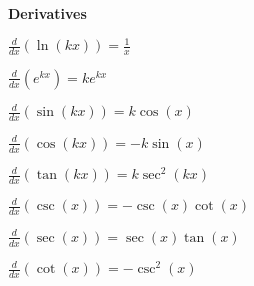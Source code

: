 \documentclass{article}
\begin{document}
\begin{multicols*}{4}
\textbf{Derivatives}

$\frac{d}{dx}(\ln(kx))=\frac{1}{x}$

$\frac{d}{dx}(e^{kx})=ke^{kx}$

$\frac{d}{dx}(\sin(kx))=k\cos(x)$

$\frac{d}{dx}(\cos(kx))=-k\sin(x)$

$\frac{d}{dx}(\tan(kx))=k\sec^2(kx)$

$\frac{d}{dx}(\csc(x))=-\csc(x)\cot(x)$

$\frac{d}{dx}(\sec(x))=\sec(x)\tan(x)$

$\frac{d}{dx}(\cot(x))=-\csc^2(x)$


\end{multicols*}
\end{document}
